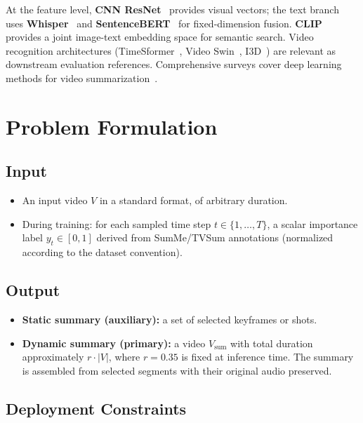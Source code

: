 \documentclass[10pt,conference]{IEEEtran}
\begin{document}
At the feature level, \textbf{CNN ResNet}~\cite{he2016} provides visual
vectors; the text branch uses \textbf{Whisper}~\cite{radford2023whisper} and
\textbf{SentenceBERT}~\cite{reimers2019} for fixed-dimension fusion.
\textbf{CLIP}~\cite{radford2021clip} provides a joint image-text embedding
space for semantic search. Video recognition architectures
(TimeSformer~\cite{bertasius2021}, Video Swin~\cite{liu2022swin},
I3D~\cite{carreira2017}) are relevant as downstream evaluation references.
Comprehensive surveys cover deep learning methods for video
summarization~\cite{apostolidis2021survey,yu2026deeplearning,tiwari2021survey,meena2023review}.

\section{Problem Formulation}

\subsection{Input}
\begin{itemize}
  \item An input video $V$ in a standard format, of arbitrary duration.
  \item During training: for each sampled time step $t \in \{1,\dots,T\}$, a
        scalar importance label $y_t \in [0,1]$ derived from SumMe/TVSum
        annotations (normalized according to the dataset convention).
\end{itemize}

\subsection{Output}
\begin{itemize}
  \item \textbf{Static summary (auxiliary):} a set of selected keyframes or
        shots.
  \item \textbf{Dynamic summary (primary):} a video $V_{\mathrm{sum}}$ with
        total duration approximately $r \cdot |V|$, where $r = 0.35$ is fixed
        at inference time. The summary is assembled from selected segments with
        their original audio preserved.
\end{itemize}

\subsection{Deployment Constraints}
\end{document}
